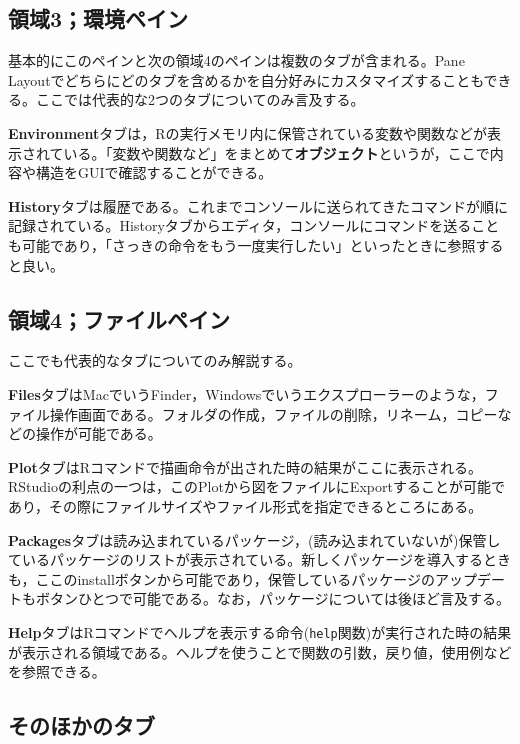 \documentclass[
  a4paper,
]{ltjsbook}
\begin{document}
\hypertarget{ux9818ux57df3ux74b0ux5883ux30daux30a4ux30f3-1}{%
\subsection{領域3；環境ペイン}\label{ux9818ux57df3ux74b0ux5883ux30daux30a4ux30f3-1}}

基本的にこのペインと次の領域4のペインは複数のタブが含まれる。Pane
Layoutでどちらにどのタブを含めるかを自分好みにカスタマイズすることもできる。ここでは代表的な2つのタブについてのみ言及する。

\textbf{Environment}タブは，Rの実行メモリ内に保管されている変数や関数などが表示されている。「変数や関数など」をまとめて\textbf{オブジェクト}というが，ここで内容や構造をGUIで確認することができる。

\textbf{History}タブは履歴である。これまでコンソールに送られてきたコマンドが順に記録されている。Historyタブからエディタ，コンソールにコマンドを送ることも可能であり，「さっきの命令をもう一度実行したい」といったときに参照すると良い。

\hypertarget{ux9818ux57df4ux30d5ux30a1ux30a4ux30ebux30daux30a4ux30f3-1}{%
\subsection{領域4；ファイルペイン}\label{ux9818ux57df4ux30d5ux30a1ux30a4ux30ebux30daux30a4ux30f3-1}}

ここでも代表的なタブについてのみ解説する。

\textbf{Files}タブはMacでいうFinder，Windowsでいうエクスプローラーのような，ファイル操作画面である。フォルダの作成，ファイルの削除，リネーム，コピーなどの操作が可能である。

\textbf{Plot}タブはRコマンドで描画命令が出された時の結果がここに表示される。RStudioの利点の一つは，このPlotから図をファイルにExportすることが可能であり，その際にファイルサイズやファイル形式を指定できるところにある。

\textbf{Packages}タブは読み込まれているパッケージ，(読み込まれていないが)保管しているパッケージのリストが表示されている。新しくパッケージを導入するときも，ここのinstallボタンから可能であり，保管しているパッケージのアップデートもボタンひとつで可能である。なお，パッケージについては後ほど言及する。

\textbf{Help}タブはRコマンドでヘルプを表示する命令(\texttt{help}関数)が実行された時の結果が表示される領域である。ヘルプを使うことで関数の引数，戻り値，使用例などを参照できる。

\hypertarget{ux305dux306eux307bux304bux306eux30bfux30d6-1}{%
\subsection{そのほかのタブ}\label{ux305dux306eux307bux304bux306eux30bfux30d6-1}}
\end{document}
